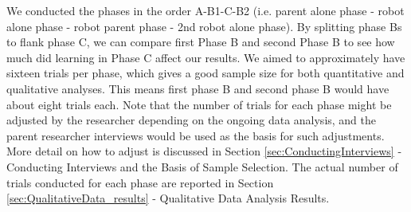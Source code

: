 We conducted the phases in the order A-B1-C-B2 (i.e. parent alone phase - robot alone phase - robot parent phase - 2nd robot alone phase).  By splitting phase Bs to flank phase C, we can compare first Phase B and second Phase B to see how much did learning in Phase C affect our results.  We aimed to approximately have sixteen trials per phase, which gives a good sample size for both quantitative and qualitative analyses.  This means first phase B and second phase B would have about eight trials each.  Note that the number of trials for each phase might be adjusted by the researcher depending on the ongoing data analysis, and the parent researcher interviews would be used as the basis for such adjustments.  More detail on how to adjust is discussed in Section \ref{sec:ConductingInterviews} - Conducting Interviews and the Basis of Sample Selection.  The actual number of trials conducted for each phase are reported in Section \ref{sec:QualitativeData_results} - Qualitative Data Analysis Results.


